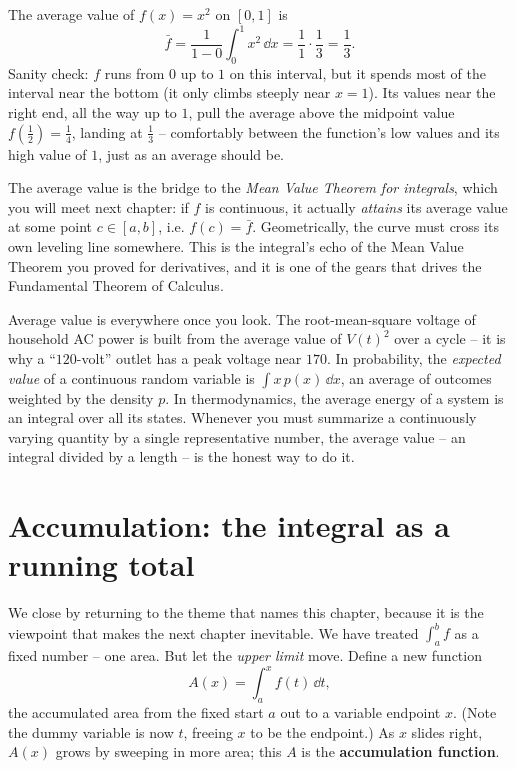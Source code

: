 \begin{example}
\label{ch20:ex-avg}
The average value of $f(x)=x^2$ on $[0,1]$ is
\[
  \bar f = \frac{1}{1-0}\int_0^1 x^2\,\dd x = \frac{1}{1}\cdot\frac13 = \frac13.
\]
Sanity check: $f$ runs from $0$ up to $1$ on this interval, but it spends most of
the interval near the bottom (it only climbs steeply near $x=1$). Its values near
the right end, all the way up to $1$, pull the average above the midpoint value
$f(\tfrac12)=\tfrac14$, landing at $\tfrac13$ -- comfortably between the
function's low values and its high value of $1$, just as an average should be.
\end{example}

\begin{connectionbox}
The average value is the bridge to the \emph{Mean Value Theorem for integrals},
which you will meet next chapter: if $f$ is continuous, it actually \emph{attains}
its average value at some point $c\in[a,b]$, i.e. $f(c)=\bar f$. Geometrically,
the curve must cross its own leveling line somewhere. This is the integral's echo
of the Mean Value Theorem you proved for derivatives, and it is one of the gears
that drives the Fundamental Theorem of Calculus.
\end{connectionbox}

\begin{applicationbox}
Average value is everywhere once you look. The root-mean-square voltage of
household AC power is built from the average value of $V(t)^2$ over a cycle -- it
is why a ``$120$-volt'' outlet has a peak voltage near $170$. In probability, the
\emph{expected value} of a continuous random variable is $\int x\,p(x)\,\dd x$, an
average of outcomes weighted by the density $p$. In thermodynamics, the average
energy of a system is an integral over all its states. Whenever you must
summarize a continuously varying quantity by a single representative number, the
average value -- an integral divided by a length -- is the honest way to do it.
\end{applicationbox}

\section{Accumulation: the integral as a running total}
\label{ch20:accumulation}

We close by returning to the theme that names this chapter, because it is the
viewpoint that makes the next chapter inevitable. We have treated $\int_a^b f$ as
a fixed number -- one area. But let the \emph{upper limit} move. Define a new
function
\[
  A(x) = \int_a^x f(t)\,\dd t,
\]
the accumulated area from the fixed start $a$ out to a variable endpoint $x$.
(Note the dummy variable is now $t$, freeing $x$ to be the endpoint.) As $x$
slides right, $A(x)$ grows by sweeping in more area; this $A$ is the
\textbf{accumulation function}.


